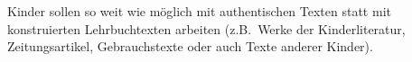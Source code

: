 Kinder sollen so weit wie möglich mit authentischen Texten statt mit konstruierten Lehrbuchtexten arbeiten (z.B.\ Werke der Kinderliteratur, Zeitungsartikel, Gebrauchstexte oder auch Texte anderer Kinder).